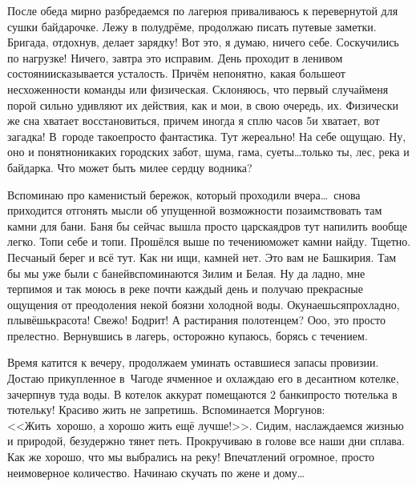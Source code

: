 После обеда мирно разбредаемся по лагерю\mdash я приваливаюсь к перевернутой для сушки байдарочке. Лежу в полудрёме, продолжаю писать путевые заметки. Бригада, отдохнув, делает зарядку! Вот это, я думаю, ничего себе. Соскучились по нагрузке! Ничего, завтра это исправим. День проходит в ленивом состоянии\mdash сказывается усталость. Причём непонятно, какая больше\mdash от несхоженности команды или физическая. Склоняюсь, что первый случай\mdash меня порой сильно удивляют их действия, как и мои, в свою очередь, их. Физически же сна хватает восстановиться, причем иногда я сплю часов 5\mdash и хватает, вот загадка! В~городе такое\mdash просто фантастика. Тут же\mdash реально! На себе ощущаю. Ну, оно и понятно\mdash никаких городских забот, шума, гама, суеты\ldots только ты, лес, река и байдарка. Что может быть милее сердцу водника? 

Вспоминаю про каменистый бережок, который проходили вчера\ldots~снова приходится отгонять мысли об упущенной возможности позаимствовать там камни для бани. Баня бы сейчас вышла просто царская\mdash дров тут напилить вообще легко. Топи себе и топи. Прошёлся выше по течению\mdash может камни найду. Тщетно. Песчаный берег и всё тут. Как ни ищи, камней нет. Это вам не Башкирия. Там бы мы уже были с баней\mdash вспоминаются Зилим и Белая. Ну да ладно, мне терпимо\mdash я и так моюсь в реке почти каждый день и получаю прекрасные ощущения от преодоления некой боязни холодной воды. Окунаешься\mdash прохладно, плывёшь\mdash красота! Свежо! Бодрит! А растирания полотенцем? О\sdash о\sdash о, это просто прелестно. Вернувшись в лагерь, осторожно купаюсь, борясь с течением. 

Время катится к вечеру, продолжаем уминать оставшиеся запасы провизии. Достаю прикупленное в~Чагоде ячменное и охлаждаю его в десантном котелке, зачерпнув туда воды. В котелок аккурат помещаются 2 банки\mdash просто тютелька в тютельку! Красиво жить не запретишь. Вспоминается Моргунов: <<Жить~хорошо, а хорошо жить ещё лучше!>>. Сидим, наслаждаемся жизнью и природой, безудержно тянет петь. Прокручиваю в голове все наши дни сплава. Как же хорошо, что мы выбрались на реку! Впечатлений огромное, просто неимоверное количество. Начинаю скучать по жене и дому\ldots~

